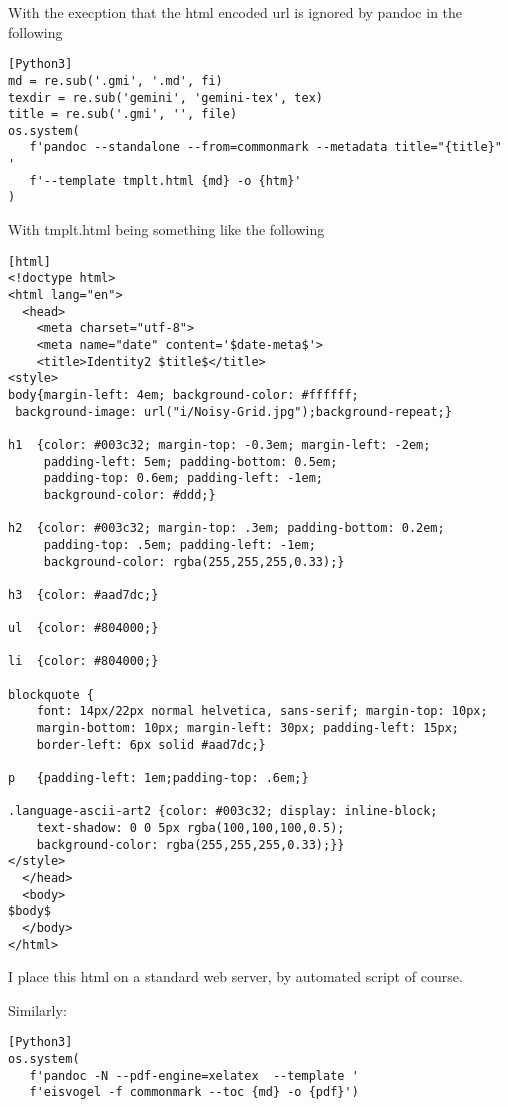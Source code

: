 \documentclass[
]{article}
\begin{document}
With the execption that the html encoded url is ignored by pandoc in the
following

\begin{verbatim}
[Python3]
md = re.sub('.gmi', '.md', fi)
texdir = re.sub('gemini', 'gemini-tex', tex)
title = re.sub('.gmi', '', file)
os.system(
   f'pandoc --standalone --from=commonmark --metadata title="{title}" '
   f'--template tmplt.html {md} -o {htm}'
)
\end{verbatim}

With tmplt.html being something like the following

\begin{verbatim}
[html]
<!doctype html>
<html lang="en">
  <head>
    <meta charset="utf-8">
    <meta name="date" content='$date-meta$'>
    <title>Identity2 $title$</title>
<style>
body{margin-left: 4em; background-color: #ffffff;
 background-image: url("i/Noisy-Grid.jpg");background-repeat;}
              
h1  {color: #003c32; margin-top: -0.3em; margin-left: -2em;
     padding-left: 5em; padding-bottom: 0.5em; 
     padding-top: 0.6em; padding-left: -1em; 
     background-color: #ddd;}

h2  {color: #003c32; margin-top: .3em; padding-bottom: 0.2em;
     padding-top: .5em; padding-left: -1em; 
     background-color: rgba(255,255,255,0.33);}
     
h3  {color: #aad7dc;}

ul  {color: #804000;}

li  {color: #804000;}

blockquote {
    font: 14px/22px normal helvetica, sans-serif; margin-top: 10px;
    margin-bottom: 10px; margin-left: 30px; padding-left: 15px;
    border-left: 6px solid #aad7dc;}

p   {padding-left: 1em;padding-top: .6em;}

.language-ascii-art2 {color: #003c32; display: inline-block; 
    text-shadow: 0 0 5px rgba(100,100,100,0.5);
    background-color: rgba(255,255,255,0.33);}}
</style>
  </head>
  <body>
$body$
  </body>
</html>
\end{verbatim}

I place this html on a standard web server, by automated script of
course.

Similarly:

\begin{verbatim}
[Python3]
os.system(
   f'pandoc -N --pdf-engine=xelatex  --template '
   f'eisvogel -f commonmark --toc {md} -o {pdf}')
\end{verbatim}
\end{document}
